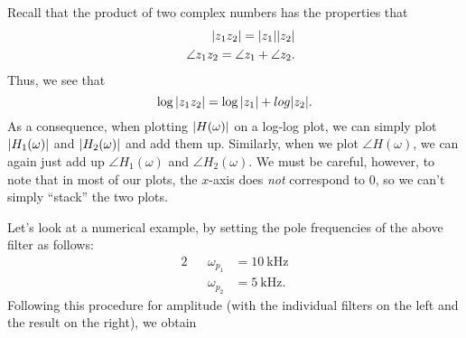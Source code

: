 \documentclass[letterpaper]{article}
\theoremstyle{remark}
\DeclarePairedDelimiter\abs{\lvert}{\rvert}%
\newcommand{\eqn}[1]{\begin{alignat*}{2}#1\end{alignat*}}
\begin{document}
Recall that the product of two complex numbers has the properties that
\eqn{
    && \abs{z_1z_2} = \abs{z_1}\abs{z_2} \\
    && \angle{z_1z_2} = \angle{z_1} + \angle{z_2}.
}
Thus, we see that
\[
    \log{\abs{z_1z_2}} = \log{\abs{z_1}} + log{\abs{z_2}}.
\]
As a consequence, when plotting $\abs{H(\omega)}$ on a log-log plot, we can simply plot $\abs{H_1(\omega)}$ and $\abs{H_2(\omega)}$ and add them up. Similarly, when we plot $\angle{H(\omega)}$, we can again just add up $\angle{H_1(\omega)}$ and $\angle{H_2(\omega)}$. We must be careful, however, to note that in most of our plots, the $x$-axis does \emph{not} correspond to $0$, so we can't simply ``stack'' the two plots.

Let's look at a numerical example, by setting the pole frequencies of the above filter as follows:
\eqn{
    && \omega_{p_1} &= \SI{10}{\kilo\hertz} \\
    && \omega_{p_2} &= \SI{5}{\kilo\hertz}.
}
Following this procedure for amplitude (with the individual filters on the left and the result on the right), we obtain
\end{document}
